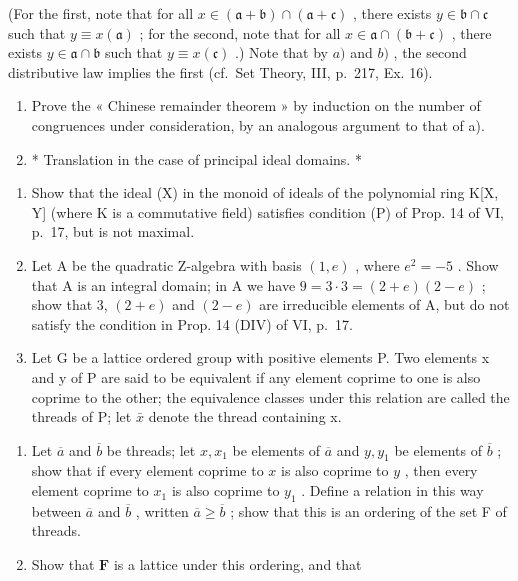 (For the first, note that for all \(x \in (\mathfrak{a} + \mathfrak{b}) \cap (\mathfrak{a} + \mathfrak{c})\) , there exists \(y \in \mathfrak{b} \cap \mathfrak{c}\) such that \(y \equiv x(\mathfrak{a})\) ; for the second, note that for all \(x \in \mathfrak{a} \cap (\mathfrak{b} + \mathfrak{c})\) , there exists \(y \in \mathfrak{a} \cap \mathfrak{b}\) such that \(y \equiv x(\mathfrak{c})\) .) Note that by \(a)\) and \(b)\) , the second distributive law implies the first (cf.~Set Theory, III, p.~217, Ex. 16).

\begin{enumerate}
\def\labelenumi{\alph{enumi})}
\setcounter{enumi}{2}
\item
  Prove the « Chinese remainder theorem » by induction on the number of congruences under consideration, by an analogous argument to that of a).
\item
  * Translation in the case of principal ideal domains. *
\end{enumerate}

\begin{enumerate}
\def\labelenumi{\arabic{enumi})}
\setcounter{enumi}{25}
\item
  Show that the ideal (X) in the monoid of ideals of the polynomial ring K{[}X, Y{]} (where K is a commutative field) satisfies condition (P) of Prop. 14 of VI, p.~17, but is not maximal.
\item
  Let A be the quadratic Z-algebra with basis \((1, e)\) , where \(e^{2} = -5\) . Show that A is an integral domain; in A we have \(9 = 3 \cdot 3 = (2 + e)(2 - e)\) ; show that 3, \((2 + e)\) and \((2 - e)\) are irreducible elements of A, but do not satisfy the condition in Prop. 14 (DIV) of VI, p.~17.
\item
  Let G be a lattice ordered group with positive elements P. Two elements x and y of P are said to be equivalent if any element coprime to one is also coprime to the other; the equivalence classes under this relation are called the threads of P; let \(\bar{x}\) denote the thread containing x.
\end{enumerate}

\begin{enumerate}
\def\labelenumi{\alph{enumi})}
\item
  Let \(\overline{a}\) and \(\overline{b}\) be threads; let \(x, x_1\) be elements of \(\overline{a}\) and \(y, y_1\) be elements of \(\overline{b}\) ; show that if every element coprime to \(x\) is also coprime to \(y\) , then every element coprime to \(x_1\) is also coprime to \(y_1\) . Define a relation in this way between \(\overline{a}\) and \(\overline{b}\) , written \(\overline{a} \geqslant \overline{b}\) ; show that this is an ordering of the set F of threads.
\item
  Show that \(\mathbf{F}\) is a lattice under this ordering, and that
\end{enumerate}

